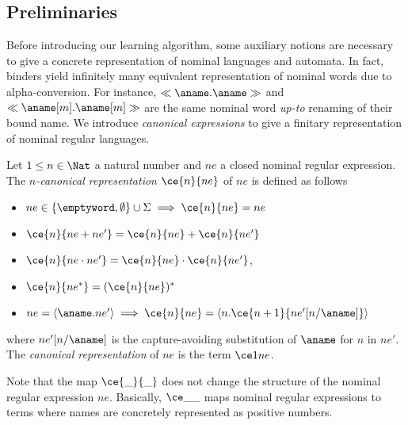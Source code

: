 \subsection{Preliminaries}
Before introducing our learning algorithm, some auxiliary notions are
necessary to give a concrete representation of nominal languages
and automata.
%
In fact, binders yield infinitely many equivalent representation of nominal words
due to alpha-conversion.
%
For instance, $\ll \aname. \aname \gg$ and
$\ll \aname[m].\aname[m] \gg$ are the same nominal word \emph{up-to}
renaming of their bound name.
%
We introduce \emph{canonical expressions} to give a finitary
representation of nominal regular languages.

\begin{definition}\label{def:CE}
  Let $1 \leq n  \in \Nat$ a natural number and $ne$ a closed nominal
  regular expression.
  The \emph{$n$-canonical representation} $\ce{n}{ne}$ of $ne$ is
  defined as follows
  \begin{itemize}
  \item $ne \in \{\emptyword,\emptyset\}\cup \Sigma \implies \ce{n}{ne} =ne$
  \item $\ce{n}{ne+ne'} =\ce{n}{ne}+\ce{n}{ne'}$
  \item $\ce{n}{ne\cdot ne'} =\ce{n}{ne}\cdot \ce{n}{ne'}$,
  \item $\ce{n}{ne^*} =(\ce{n}{ne})^*$
  \item $ne=\langle \aname. ne'\rangle \implies \ce{n}{ne} =\langle n. \ce{n+1}{ne'[n/\aname]}\rangle$
  \end{itemize}
  where $ne'[n/\aname]$ is the capture-avoiding substitution of
  $\aname$ for $n$ in $ne'$.
  The \emph{canonical representation} of $ne$ is the term
  $\ce 1 {ne}$.
\end{definition}
%
Note that the map $\ce{\_}{\_}$ does not change the structure of the
nominal regular expression $ne$.  Basically, $\ce \_ \_$ maps nominal
regular expressions to terms where names are concretely represented as
positive numbers.
